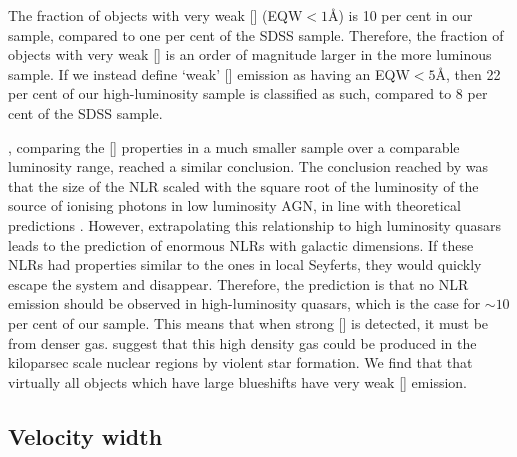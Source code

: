 The fraction of objects with very weak [] (EQW$<1$\AA) is 10 per cent in our sample, compared to one per cent of the SDSS sample. 
Therefore, the fraction of objects with very weak [] is an order of magnitude larger in the more luminous sample. 
If we instead define `weak' [] emission as having an EQW$<5$\AA, then 22 per cent of our high-luminosity sample is classified as such, compared to 8 per cent of the SDSS sample. 

\citet{netzer04}, comparing the [] properties in a much smaller sample over a comparable luminosity range, reached a similar conclusion. 
The conclusion reached by \citet{netzer04} was that the size of the NLR scaled with the square root of the luminosity of the source of ionising photons in low luminosity AGN, in line with theoretical predictions \citep[e.g.][]{netzer90}. 
However, extrapolating this relationship to high luminosity quasars leads to the prediction of enormous NLRs with galactic dimensions. 
If these NLRs had properties similar to the ones in local Seyferts, they would quickly escape the system and disappear. 
Therefore, the prediction is that no NLR emission should be observed in high-luminosity quasars, which is the case for $\sim10$ per cent of our sample. 
This means that when strong [] is detected, it must be from denser gas. 
\citet{netzer04} suggest that this high density gas could be produced in the kiloparsec scale nuclear regions by violent star formation.  
We find that that virtually all objects which have large  blueshifts have very weak [] emission. 
 
\subsection{Velocity width}

